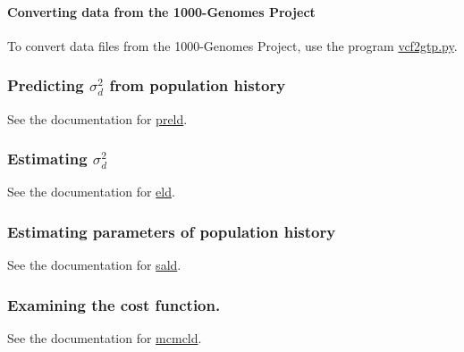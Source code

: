 \paragraph*{Converting data from the 1000-\/\+Genomes Project}

To convert data files from the 1000-\/\+Genomes Project, use the program \hyperlink{vcf2gtp_8py_vcf2gtp}{vcf2gtp.py}.

\subsubsection*{Predicting $\sigma_d^2$ from population history}

See the documentation for \hyperlink{preld_8c_preld}{preld}.

\subsubsection*{Estimating $\sigma_d^2$}

See the documentation for \hyperlink{eld_8c_eld}{eld}.

\subsubsection*{Estimating parameters of population history}

See the documentation for \hyperlink{sald_8c_sald}{sald}.

\subsubsection*{Examining the cost function.}

See the documentation for \hyperlink{mcmcld_8c_mcmcld}{mcmcld}. 